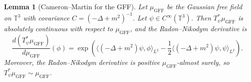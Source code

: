 \documentclass[12pt]{article}
\newtheorem{lemma}[theorem]{Lemma}
\begin{document}
\begin{lemma}[Cameron--Martin for the GFF]\label{lem:CM}
Let $\mu_{\mathrm{GFF}}$ be the Gaussian free field on $\mathbb{T}^3$ with covariance $C = (-\Delta + m^2)^{-1}$. Let $\psi \in C^\infty(\mathbb{T}^3)$. Then $T_\psi^* \mu_{\mathrm{GFF}}$ is absolutely continuous with respect to $\mu_{\mathrm{GFF}}$, and the Radon--Nikodym derivative is
\begin{equation}\label{eq:CM-RN}
\frac{d(T_\psi^* \mu_{\mathrm{GFF}})}{d\mu_{\mathrm{GFF}}}(\phi) = \exp\!\left(\langle (-\Delta + m^2)\psi, \phi\rangle_{L^2} - \frac{1}{2}\langle (-\Delta + m^2)\psi, \psi\rangle_{L^2}\right).
\end{equation}
Moreover, the Radon--Nikodym derivative is positive $\mu_{\mathrm{GFF}}$-almost surely, so $T_\psi^* \mu_{\mathrm{GFF}} \sim \mu_{\mathrm{GFF}}$.
\end{lemma}
\end{document}
